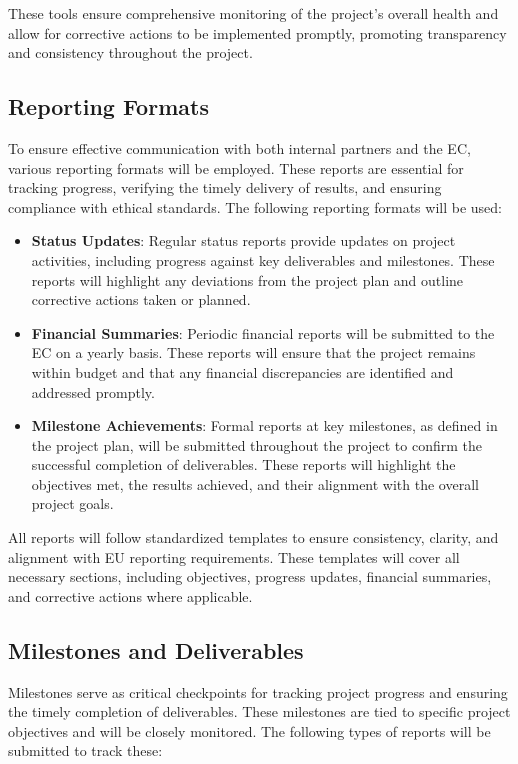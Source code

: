 \documentclass[a4paper,12pt]{article}
\begin{document}
These tools ensure comprehensive monitoring of the project’s overall health and allow for corrective actions to be implemented promptly, promoting transparency and consistency throughout the project.

\subsection{\textcolor{EUblue}{Reporting Formats}}

To ensure effective communication with both internal partners and the EC, various reporting formats will be employed. These reports are essential for tracking progress, verifying the timely delivery of results, and ensuring compliance with ethical standards. The following reporting formats will be used:

\begin{itemize}[left=1em, itemsep=0pt, topsep=0pt] 
    \item \textbf{Status Updates}: Regular status reports provide updates on project activities, including progress against key deliverables and milestones. These reports will highlight any deviations from the project plan and outline corrective actions taken or planned. 
    \item \textbf{Financial Summaries}: Periodic financial reports will be submitted to the EC on a yearly basis. These reports will ensure that the project remains within budget and that any financial discrepancies are identified and addressed promptly.
    \item \textbf{Milestone Achievements}: Formal reports at key milestones, as defined in the project plan, will be submitted throughout the project to confirm the successful completion of deliverables. These reports will highlight the objectives met, the results achieved, and their alignment with the overall project goals.
\end{itemize}

All reports will follow standardized templates to ensure consistency, clarity, and alignment with EU reporting requirements. These templates will cover all necessary sections, including objectives, progress updates, financial summaries, and corrective actions where applicable.

\subsection{\textcolor{EUblue}{Milestones and Deliverables}}

Milestones serve as critical checkpoints for tracking project progress and ensuring the timely completion of deliverables. These milestones are tied to specific project objectives and will be closely monitored. The following types of reports will be submitted to track these:
\end{document}

